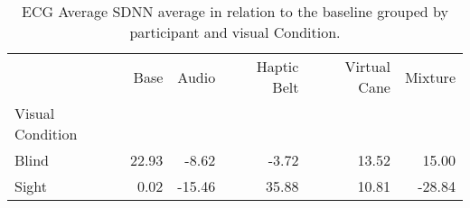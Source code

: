 
\begin{table}[!htb]
\centering
\caption{ECG Average SDNN average in relation to the baseline grouped by participant and visual Condition.}
\label{tab:sdnn_average_group}
\begin{tabular}{lrrrrr}
\toprule
{} &   Base &   Audio & Haptic Belt & Virtual Cane & Mixture \\
Visual Condition &        &         &             &              &         \\
\midrule
Blind            &  22.93 &   -8.62 &       -3.72 &        13.52 &   15.00 \\
Sight            &   0.02 &  -15.46 &       35.88 &        10.81 &  -28.84 \\
\bottomrule
\end{tabular}
\end{table}

